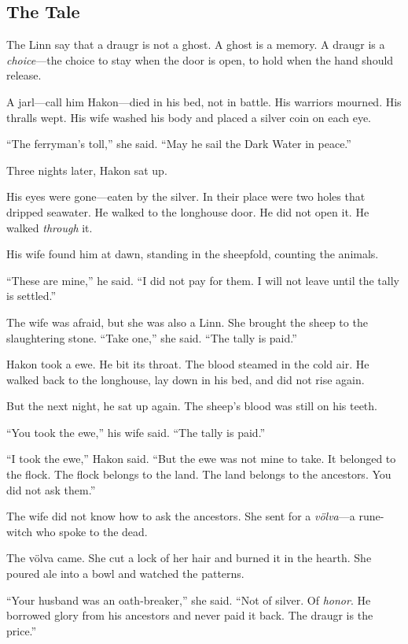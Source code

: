 \documentclass[9pt,a5paper]{extbook}
\begin{document}
\subsection*{The Tale}

The Linn say that a draugr is not a ghost. A ghost is a memory. A draugr is a \textit{choice}---the choice to stay when the door is open, to hold when the hand should release.

A jarl---call him Hakon---died in his bed, not in battle. His warriors mourned. His thralls wept. His wife washed his body and placed a silver coin on each eye.

``The ferryman's toll,'' she said. ``May he sail the Dark Water in peace.''

Three nights later, Hakon sat up.

His eyes were gone---eaten by the silver. In their place were two holes that dripped seawater. He walked to the longhouse door. He did not open it. He walked \textit{through} it.

His wife found him at dawn, standing in the sheepfold, counting the animals.

``These are mine,'' he said. ``I did not pay for them. I will not leave until the tally is settled.''

The wife was afraid, but she was also a Linn. She brought the sheep to the slaughtering stone. ``Take one,'' she said. ``The tally is paid.''

Hakon took a ewe. He bit its throat. The blood steamed in the cold air. He walked back to the longhouse, lay down in his bed, and did not rise again.

But the next night, he sat up again. The sheep's blood was still on his teeth.

``You took the ewe,'' his wife said. ``The tally is paid.''

``I took the ewe,'' Hakon said. ``But the ewe was not mine to take. It belonged to the flock. The flock belongs to the land. The land belongs to the ancestors. You did not ask them.''

The wife did not know how to ask the ancestors. She sent for a \textit{völva}---a rune-witch who spoke to the dead.

The völva came. She cut a lock of her hair and burned it in the hearth. She poured ale into a bowl and watched the patterns.

``Your husband was an oath-breaker,'' she said. ``Not of silver. Of \textit{honor}. He borrowed glory from his ancestors and never paid it back. The draugr is the price.''
\end{document}
